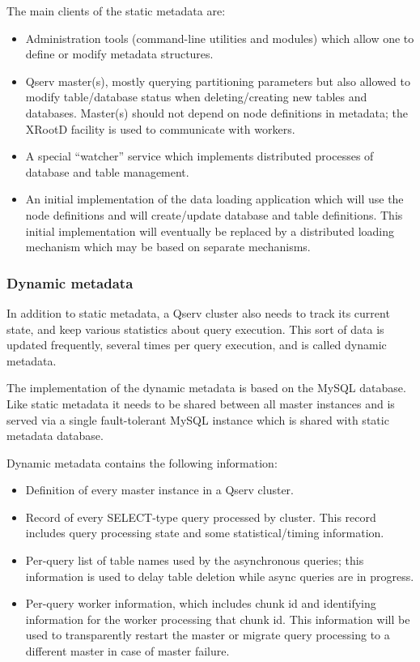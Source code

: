 \documentclass[DM,lsstdraft,toc]{lsstdoc}
\begin{document}
The main clients of the static metadata are:

\begin{itemize}
\item
  Administration tools (command-line utilities and modules) which allow
  one to define or modify metadata structures.
\item
  Qserv master(s), mostly querying partitioning parameters but also
  allowed to modify table/database status when deleting/creating new
  tables and databases. Master(s) should not depend on node definitions
  in metadata; the XRootD facility is used to communicate with workers.
\item
  A special ``watcher'' service which implements distributed processes of
  database and table management.
\item
  An initial implementation of the data loading application which will
  use the node definitions and will create/update database and table
  definitions. This initial implementation will eventually be replaced
  by a distributed loading mechanism which may be based on separate
  mechanisms.
\end{itemize}

\subsubsection{Dynamic metadata}\label{dynamic-metadata}

In addition to static metadata, a Qserv cluster also needs to track its
current state, and keep various statistics about query execution. This
sort of data is updated frequently, several times per query execution,
and is called dynamic metadata.

The implementation of the dynamic metadata is based on the MySQL
database. Like static metadata it needs to be shared between all master
instances and is served via a single fault-tolerant MySQL instance
which is shared with static metadata database.

Dynamic metadata contains the following information:

\begin{itemize}
\item
  Definition of every master instance in a Qserv cluster.
\item
  Record of every SELECT-type query processed by cluster. This record
  includes query processing state and some statistical/timing
  information.
\item
  Per-query list of table names used by the asynchronous queries; this
  information is used to delay table deletion while async queries are in
  progress.
\item
  Per-query worker information, which includes chunk id and identifying
  information for the worker processing that chunk id. This information
  will be used to transparently restart the master or migrate query
  processing to a different master in case of master failure.
\end{itemize}
\end{document}
